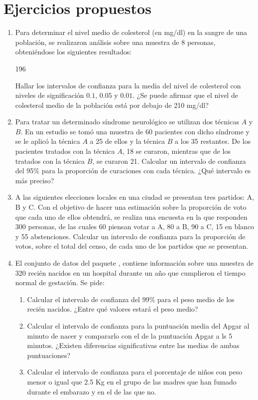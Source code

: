 \section{Ejercicios propuestos}
\begin{enumerate}[leftmargin=*] \item  Para determinar el nivel medio de colesterol (en mg/dl) en la sangre de una población, se
realizaron análisis sobre una muestra de 8 personas, obteniéndose los siguientes resultados: 
\begin{center}
196
\end{center}
Hallar los intervalos de confianza para la media del nivel de colesterol con niveles de significación $0.1$, $0.05$ y
$0.01$. ¿Se puede afirmar que el nivel de colesterol medio de la población está por debajo de 210 mg/dl?

\item Para tratar un determinado síndrome neurológico se utilizan dos técnicas $A$ y $B$. En un estudio se tomó una
muestra de 60 pacientes con dicho síndrome y se le aplicó la técnica $A$ a 25 de ellos y la técnica $B$ a los 35
restantes. De los pacientes tratados con la técnica $A$, 18 se curaron, mientras que de los tratados con la técnica $B$,
se curaron 21. Calcular un intervalo de confianza del 95\% para la proporción de curaciones con cada técnica. ¿Qué intervalo es más preciso?

\item A las siguientes elecciones locales en una ciudad se presentan tres partidos: A, B y C. Con el objetivo de hacer
una estimación sobre la proporción de voto que cada uno de ellos obtendrá, se realiza una encuesta en la que responden
300 personas, de las cuales 60 piensan votar a A, 80 a B, 90 a C, 15 en blanco y 55 abstenciones. Calcular un intervalo
de confianza para la proporción de votos, sobre el total del censo, de cada uno de los partidos que se presentan.

\item El conjunto de datos  del paquete , contiene información sobre una
muestra de 320 recién nacidos en un hospital durante un año que cumplieron el tiempo normal de gestación. 
Se pide:
\begin{enumerate}
\item Calcular el intervalo de confianza del 99\% para el peso medio de los recién nacidos. ¿Entre qué valores estará el
peso medio?
\item Calcular el intervalo de confianza para la puntuación media del Apgar al minuto de nacer y compararlo con el de la
puntuación Apgar a ls 5 minutos. ¿Existen diferencias significativas entre las medias de ambas puntuaciones?
\item Calcular el intervalo de confianza para el porcentaje de niños con peso menor o igual que 2.5 Kg en el grupo de
las madres que han fumado durante el embarazo y en el de las que no. 
\end{enumerate}
\end{enumerate}
